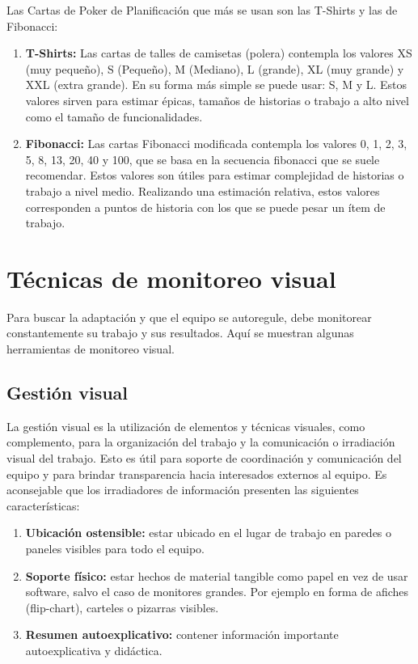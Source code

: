 Las Cartas de Poker de Planificación que más se usan son las T-Shirts y las de Fibonacci:

\begin{enumerate}

\item \textbf{T-Shirts:} Las cartas de talles de camisetas (polera) contempla los valores XS (muy pequeño), S (Pequeño), M (Mediano), L (grande), XL (muy grande) y XXL (extra grande). En su forma más simple se puede usar: S, M y L. Estos valores sirven para estimar épicas, tamaños de historias o trabajo a alto nivel como el tamaño de funcionalidades. 

\item \textbf{Fibonacci:} Las cartas Fibonacci modificada contempla los valores 0, 1, 2, 3, 5, 8, 13, 20, 40 y 100, que se basa en la secuencia fibonacci que se suele recomendar. Estos valores son útiles para estimar complejidad de historias o trabajo a nivel medio. Realizando una estimación relativa, estos valores corresponden a puntos de historia con los que se puede pesar un ítem de trabajo.

\end{enumerate}

\newpage
\section{Técnicas de monitoreo visual}

Para buscar la adaptación y que el equipo se autoregule, debe monitorear constantemente su trabajo y sus resultados. Aquí se muestran algunas herramientas de monitoreo visual.

\subsection{Gestión visual}

La gestión visual es la utilización de elementos y técnicas visuales, como complemento, para la organización del trabajo y la comunicación o irradiación visual del trabajo. Esto es útil para soporte de coordinación y comunicación del equipo y para brindar transparencia hacia interesados externos al equipo.
Es aconsejable que los irradiadores de información presenten las siguientes características:

\begin{enumerate}

\item \textbf{Ubicación ostensible:} estar ubicado en el lugar de trabajo en paredes o paneles visibles para todo el equipo.

\item \textbf{Soporte físico:} estar hechos de material tangible como papel en vez de usar software, salvo el caso de monitores grandes. Por ejemplo en forma de afiches (flip-chart), carteles o pizarras visibles.

\item \textbf{Resumen autoexplicativo:} contener información importante autoexplicativa y didáctica.

\end{enumerate}

